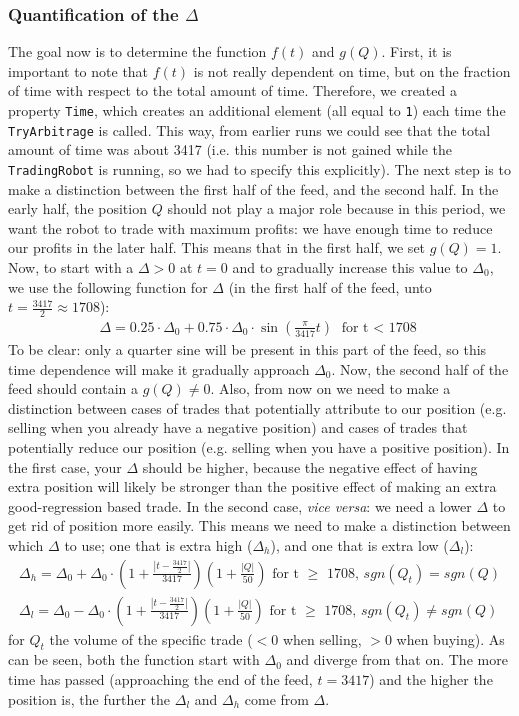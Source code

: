 \documentclass[a4paper]{article}
\begin{document}
\subsubsection{Quantification of the $\Delta$}
The goal now is to determine the function $f(t)$ and $g(Q)$. First, it is important to note that $f(t)$ is not really dependent on time, but on the fraction of time with respect to the total amount of time. Therefore, we created a property \texttt{Time}, which creates an additional element (all equal to \texttt{1}) each time the \texttt{TryArbitrage} is called. This way, from earlier runs we could see that the total amount of time was about 3417 (i.e. this number is not gained while the \texttt{TradingRobot} is running, so we had to specify this explicitly). The next step is to make a distinction between the first half of the feed, and the second half. In the early half, the position $Q$ should not play a major role because in this period, we want the robot to trade with maximum profits: we have enough time to reduce our profits in the later half. This means that in the first half, we set $g(Q)=1$. Now, to start with a $\Delta>0$ at $t=0$ and to gradually increase this value to $\Delta_0$, we use the following function for $\Delta$ (in the first half of the feed, unto $t=\frac{3417}{2}\approx 1708$):
\begin{eqnarray*}
\Delta = 0.25\cdot\Delta_0+0.75\cdot\Delta_0\cdot\sin(\frac{\pi}{3417}t)\text{ for t $<$ 1708}
\end{eqnarray*}
To be clear: only a quarter sine will be present in this part of the feed, so this time dependence will make it gradually approach $\Delta_0$. Now, the second half of the feed should contain a $g(Q)\neq 0$. Also, from now on we need to make a distinction between cases of trades that potentially attribute to our position (e.g. selling when you already have a negative position) and cases of trades that potentially reduce our position (e.g. selling when you have a positive position). In the first case, your $\Delta$ should be higher, because the negative effect of having extra position will likely be stronger than the positive effect of making an extra good-regression based trade. In the second case, \textit{vice versa}: we need a lower $\Delta$ to get rid of position more easily. This means we need to make a distinction between which $\Delta$ to use; one that is extra high ($\Delta_h$), and one that is extra low ($\Delta_l$):
\begin{eqnarray*}
\Delta_h = \Delta_0+\Delta_0\cdot (1+\frac{|t-\frac{3417}{2}|}{3417})(1+\frac{|Q|}{50})\text{ for t $\geq$ 1708, $sgn(Q_t)=sgn(Q)$}\\
\Delta_l = \Delta_0-\Delta_0\cdot (1+\frac{|t-\frac{3417}{2}|}{3417})(1+\frac{|Q|}{50})\text{ for t $\geq$ 1708, $sgn(Q_t)\neq sgn(Q)$}
\end{eqnarray*}
for $Q_t$ the volume of the specific trade ($<0$ when selling, $>0$ when buying). As can be seen, both the function start with $\Delta_0$ and diverge from that on. The more time has passed (approaching the end of the feed, $t=3417$) and the higher the position is, the further the $\Delta_l$ and $\Delta_h$ come from $\Delta$.
\end{document}
